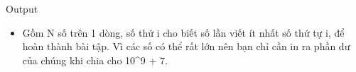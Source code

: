 Output  
\begin{itemize}
	\item     Gồm N số trên 1 dòng, số thứ i cho biết số lần viết        ít nhất    số thứ tự i,    để hoàn thành bài tập. Vì các số có thể rất lớn nên bạn chỉ cần in ra phần dư của chúng khi chia cho 10^9 + 7.   
\end{itemize}